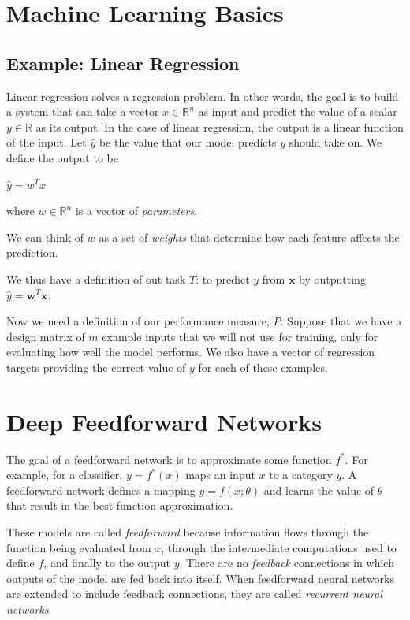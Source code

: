 \documentclass{report}
\begin{document}
\chapter{Machine Learning Basics}

\section{Example: Linear Regression}
Linear regression solves a regression problem. In other words, the goal is to build a system that can take a vector $x \in \mathbb{R}^n$ as input and predict the value of a scalar $y \in \mathbb{R}$ as its output. In the case of linear regression, the output is a linear function of the input. Let $\hat{y}$ be the value that our model predicts $y$ should take on. We define the output to be\newline
    \centerline{$\hat{y}= w^T x $}\newline
where $w \in \mathbb{R}^n$ is a vector of \textit{parameters}.\newline

We can think of $w$ as a set of \textit{weights} that determine how each feature affects the prediction.\newline

We thus have a definition of out task $T$: to predict $y$ from $\mathbf{x}$ by outputting $\hat{y}=\mathbf{w}^T\mathbf{x}$.\newline

Now we need a definition of our performance measure, $P$. Suppose that we have a design matrix of $m$ example inputs that we will not use for training, only for evaluating how well the model performs. We also have a vector of regression targets providing the correct value of $y$ for each of these examples. 

\chapter{Deep Feedforward Networks}
The goal of a feedforward network is to approximate some function $f^*$. For example, for a classifier, $y=f^*(x)$ maps an input $x$ to a category $y$. A feedforward network defines a mapping $y=f(x;\theta)$ and learns the value of $\theta$ that result in the best function approximation.\newline

\noindent These models are called \textit{feedforward} because information flows through the function being evaluated from $x$, through the intermediate computations used to define $f$, and finally to the output $y$. There are no \textit{feedback} connections in which outputs of the model are fed back into itself. When feedforward neural networks are extended to include  feedback connections, they are called \textit{recurrent neural networks}.\newline
\end{document}
